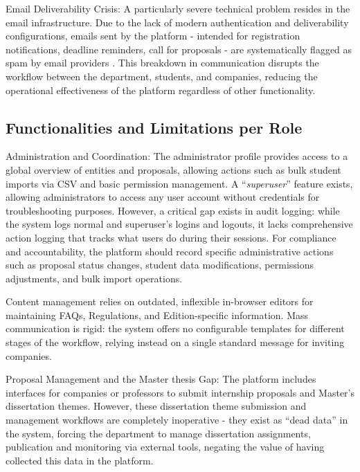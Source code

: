         {
            Email Deliverability Crisis: A particularly severe technical problem resides in the email infrastructure. 
            Due to the lack of modern authentication and deliverability configurations, emails sent by the platform - intended for registration notifications, deadline reminders, call for proposals - are systematically flagged as spam by email providers \cite{smtp-improve-deliverability-transactional-mails}. 
            This breakdown in communication disrupts the workflow between the department, students, and companies, reducing the operational effectiveness of the platform regardless of other functionality.
        }

    \subsection{Functionalities and Limitations per Role}
        {
            Administration and Coordination: The administrator profile provides access to a global overview of entities and proposals, allowing actions such as bulk student imports via CSV and basic permission management. 
            A “\textit{superuser}” feature exists, allowing administrators to access any user account without credentials for troubleshooting purposes. However, a critical gap exists in audit logging: 
            while the system logs normal and superuser's logins and logouts, it lacks comprehensive action logging that tracks what users do during their sessions. 
            For compliance and accountability, the platform should record specific administrative actions such as proposal status changes, student data modifications, permissions adjustments, and bulk import operations.
        }

        {
            Content management relies on outdated, inflexible in-browser  editors for maintaining FAQs, Regulations, and Edition-specific information. 
            Mass communication is rigid: the system offers no configurable templates for different stages of the workflow, relying instead on a single standard message for inviting companies.
        }

        {
            Proposal Management and the Master thesis Gap: 
            The platform includes interfaces for companies or professors to submit internship proposals and Master’s dissertation themes. 
            However, these dissertation theme submission and management workflows are completely inoperative - they exist as “dead data” in the system, 
            forcing the department to manage dissertation assignments, publication and monitoring via external tools, negating the value of having collected this data in the platform.
        }

